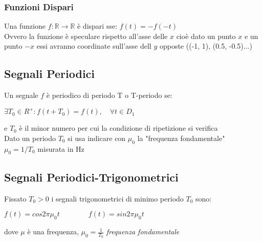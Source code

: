 \documentclass{article}
\begin{document}
    \subsubsection{Funzioni Dispari}
        Una funzione $f:\mathbb{R}\rightarrow\mathbb{R}$ è dispari sse: $f(t)=-f(-t)$\\
        Ovvero la funzione è speculare rispetto all'asse delle $x$ cioè dato un punto $x$ e un punto $-x$ essi avranno coordinate sull'asse dell $y$ opposte ((-1, 1), (0.5, -0.5)...)
        \begin{center}
        \end{center}
    \newpage
    
    \subsection{Segnali Periodici}
        Un segnale $f$ è periodico di periodo T o T-periodo se:\\
        \begin{center}
            $\exists T_0\in R^+:f(t+T_0)=f(t),\quad \forall t\in D_1$
        \end{center}
        e $T_0$ è il minor numero per cui la condizione di ripetizione si verifica\\
        
        \noindent
        Dato un periodo $T_0$ si usa indicare con $\mu_0$ la "frequenza fondamentale"\\ $\mu_0=1/T_0$ misurata in Hz
    \subsection{Segnali Periodici-Trigonometrici}
    Fissato $T_0>0$ i segnali trigonometrici di minimo periodo $T_0$ sono:\\
    \begin{center}
        $f(t)=cos2\pi\mu_0t \qquad\qquad f(t)=sin2\pi\mu_0t$
    \end{center}
    dove $\mu$ è una frequenza, $\mu_0=\frac{1}{T_0}$ \textit{frequenza fondamentale}\\
    
\end{document}

